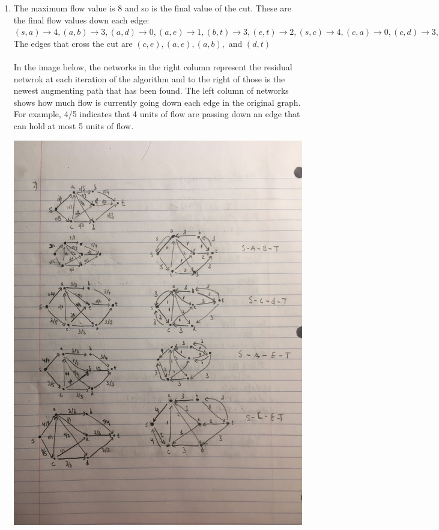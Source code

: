 \documentclass{article}
\begin{document}
\begin{enumerate}
	\item The maximum flow value is 8 and so is the final value of the cut.  These are the final flow values down each edge: $(s,a) \to 4, 
	 (a,b) \to 3,
	 (a,d) \to 0,
	 (a,e) \to 1,
	 (b,t) \to 3, 
	 (e,t) \to 2,
	 (s,c) \to 4,
	 (c,a) \to 0,   
	 (c,d) \to 3,
	 (c,e) \to 1,
	 (d,t) \to 3
	$ \\
	The edges that cross the cut are $(c,e), (a,e), (a,b),$ and $(d,t)$\\\\
	In the image below, the networks in the right column represent the residual netwrok at each iteration of the algorithm and to the right of those is the newest augmenting path that has been found.  The left column of networks shows how much flow is currently going down each edge in the original graph.  For example, 4/5 indicates that 4 units of flow are passing down an edge that can hold at most 5 units of flow.  
	
	\includegraphics[scale=.1, angle = -90]{Question_2.JPG}
	

\end{enumerate}
\end{document}

